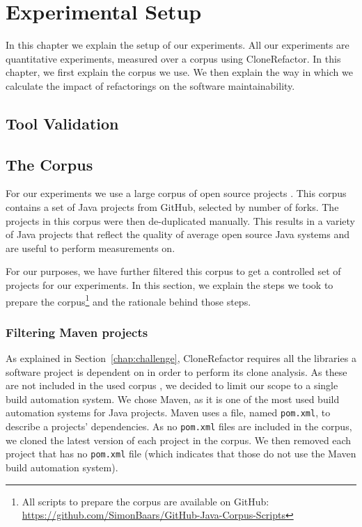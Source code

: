 \chapter{Experimental Setup}
In this chapter we explain the setup of our experiments. All our experiments are quantitative experiments, measured over a corpus using CloneRefactor. In this chapter, we first explain the corpus we use. We then explain the way in which we calculate the impact of refactorings on the software maintainability.

\section{Tool Validation}

\section{The Corpus}\label{chap:corpus}
For our experiments we use a large corpus of open source projects \cite{githubCorpus2013}. This corpus contains a set of Java projects from GitHub, selected by number of forks. The projects in this corpus were then de-duplicated manually. This results in a variety of Java projects that reflect the quality of average open source Java systems and are useful to perform measurements on.

For our purposes, we have further filtered this corpus to get a controlled set of projects for our experiments. In this section, we explain the steps we took to prepare the corpus\footnote{All scripts to prepare the corpus are available on GitHub: \url{https://github.com/SimonBaars/GitHub-Java-Corpus-Scripts}} and the rationale behind those steps.

\subsection{Filtering Maven projects}
As explained in Section~\ref{chap:challenge}, CloneRefactor requires all the libraries a software project is dependent on in order to perform its clone analysis. As these are not included in the used corpus \cite{githubCorpus2013}, we decided to limit our scope to a single build automation system. We chose Maven, as it is one of the most used build automation systems for Java projects. Maven uses a file, named \texttt{pom.xml}, to describe a projects' dependencies. As no \texttt{pom.xml} files are included in the corpus, we cloned the latest version of each project in the corpus. We then removed each project that has no \texttt{pom.xml} file (which indicates that those do not use the Maven build automation system).

